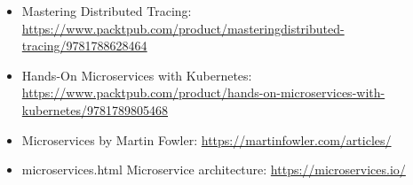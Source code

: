 

\begin{itemize}
\item 
Mastering Distributed Tracing: \url{https://www.packtpub.com/product/masteringdistributed-tracing/9781788628464}

\item 
Hands-On Microservices with Kubernetes: \url{https://www.packtpub.com/product/hands-on-microservices-with-kubernetes/9781789805468}

\item 
Microservices by Martin Fowler: \url{https://martinfowler.com/articles/}

\item 
microservices.html Microservice architecture: \url{https://microservices.io/}
\end{itemize}